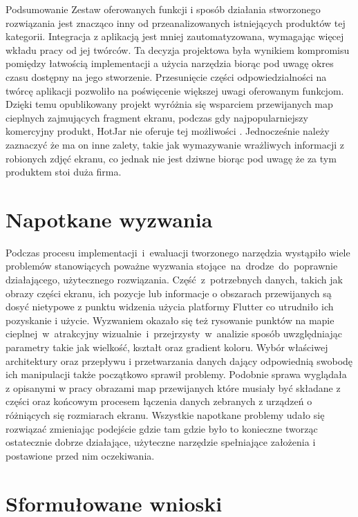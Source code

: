 \begin{chapter}{Podsumowanie}
	Zestaw oferowanych funkcji i sposób działania stworzonego rozwiązania jest znacząco inny od przeanalizowanych istniejących produktów tej kategorii. Integracja z aplikacją jest mniej zautomatyzowana, wymagając więcej wkładu pracy od jej twórców. Ta decyzja projektowa była wynikiem kompromisu pomiędzy łatwością implementacji a użycia narzędzia biorąc pod uwagę okres czasu dostępny na jego stworzenie. Przesunięcie części odpowiedzialności na twórcę aplikacji pozwoliło na poświęcenie większej uwagi oferowanym funkcjom. Dzięki temu opublikowany projekt wyróżnia się wsparciem przewijanych map cieplnych zajmujących fragment ekranu, podczas gdy najpopularniejszy komercyjny produkt, HotJar nie oferuje tej możliwości \cite{Hotjar_limitations}. Jednocześnie należy zaznaczyć że ma on inne zalety, takie jak wymazywanie wrażliwych informacji z robionych zdjęć ekranu, co jednak nie jest dziwne biorąc pod uwagę że za tym produktem stoi duża firma.
		
	\section{Napotkane wyzwania}
	Podczas procesu implementacji~i~ewaluacji tworzonego narzędzia wystąpiło wiele problemów stanowiących poważne wyzwania stojące~na~drodze~do~poprawnie działającego, użytecznego rozwiązania. Część~z~potrzebnych danych, takich jak obrazy części ekranu, ich pozycje lub informacje o obszarach przewijanych są dosyć nietypowe z punktu widzenia użycia platformy Flutter co utrudniło ich pozyskanie i użycie. Wyzwaniem okazało się też rysowanie punktów na mapie cieplnej~w~atrakcyjny wizualnie~i~przejrzysty~w~analizie sposób uwzględniając parametry takie jak wielkość, kształt oraz gradient koloru. Wybór właściwej architektury oraz przepływu i przetwarzania danych dający odpowiednią swobodę ich manipulacji także początkowo sprawił problemy. Podobnie sprawa wyglądała z opisanymi w pracy obrazami map przewijanych które musiały być składane z części oraz końcowym procesem łączenia danych zebranych z urządzeń o różniących się rozmiarach ekranu. Wszystkie napotkane problemy udało się rozwiązać zmieniając podejście gdzie tam gdzie było to konieczne tworząc ostatecznie dobrze działające, użyteczne narzędzie spełniające założenia i postawione przed nim oczekiwania.
	
	\section{Sformułowane wnioski}
	

\end{chapter}
